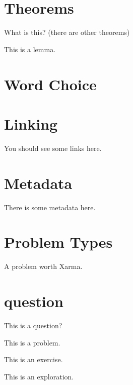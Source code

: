 \documentclass{ximera}
\begin{document}
\section{Theorems}

\begin{theorem}
What is this? (there are other theorems)
\end{theorem}

\begin{lemma}
This is a lemma.
\end{lemma}



\section{Word Choice}



\section{Linking}

You should see some links here.

\link{} %



\section{Metadata}

There is some metadata here.





\section{Problem Types}

\begin{xarmaBoost}
A problem worth Xarma.
\end{xarmaBoost}

\section{question}

\begin{question}
This is a question?
\end{question}

\begin{problem}
This is a problem.
\end{problem}

\begin{exercise}
This is an exercise.
\end{exercise}

\begin{exploration}
This is an exploration.
\end{exploration}
\end{document}
